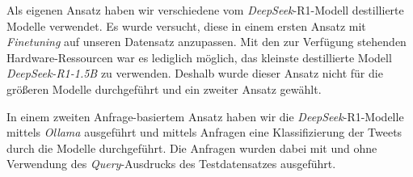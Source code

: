 Als eigenen Ansatz haben wir verschiedene vom \textit{DeepSeek}-R1-Modell destillierte Modelle \cite{deepseekai2025deepseekr1incentivizingreasoningcapability} verwendet.
Es wurde versucht, diese in einem ersten Ansatz mit \textit{Finetuning} auf unseren Datensatz anzupassen.
Mit den zur Verfügung stehenden Hardware-Ressourcen war es lediglich möglich, das kleinste destillierte Modell \textit{DeepSeek-R1-1.5B} zu verwenden.
Deshalb wurde dieser Ansatz nicht für die größeren Modelle durchgeführt und ein zweiter Ansatz gewählt.

In einem zweiten Anfrage-basiertem Ansatz haben wir die \textit{DeepSeek}-R1-Modelle mittels \textit{Ollama} \cite{ollama2025meta} ausgeführt und mittels Anfragen eine Klassifizierung der Tweets durch die Modelle durchgeführt.
Die Anfragen wurden dabei mit und ohne Verwendung des \textit{Query}-Ausdrucks des Testdatensatzes ausgeführt.
